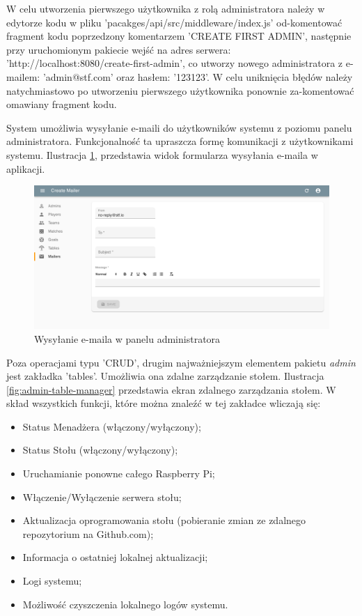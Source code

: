 W celu utworzenia pierwszego użytkownika z rolą administratora należy w edytorze kodu w pliku 'pacakges/api/src/middleware/index.js' od-komentować fragment kodu poprzedzony komentarzem 'CREATE FIRST ADMIN', następnie przy uruchomionym pakiecie wejść na adres serwera: 'http://localhost:8080/create-first-admin', co utworzy nowego administratora z e-mailem: 'admin@stf.com' oraz hasłem: '123123'. W celu uniknięcia błędów należy natychmiastowo po utworzeniu pierwszego użytkownika ponownie za-komentować omawiany fragment kodu.

\newpage

System umożliwia wysyłanie e-maili do użytkowników systemu z poziomu panelu administratora. Funkcjonalność ta upraszcza formę komunikacji z użytkownikami systemu. Ilustracja \ref{fig:admin-send-mail}, przedstawia widok formularza wysyłania e-maila w aplikacji.

\begin{figure}[h!]
  \centering
    \includegraphics[width=\textwidth]{images/admin/mailer.png}
  \caption{Wysyłanie e-maila w panelu administratora}
  \label{fig:admin-send-mail}
\end{figure}

Poza operacjami typu 'CRUD', drugim najważniejszym elementem pakietu \textit{admin} jest zakładka 'tables'. Umożliwia ona zdalne zarządzanie stołem. Ilustracja \ref{fig:admin-table-manager} przedstawia ekran zdalnego zarządzania stołem. W skład wszystkich funkcji, które można znaleźć w tej zakładce wliczają się:

\begin{itemize}
	\item Status Menadżera (włączony/wyłączony);
	\item Status Stołu (włączony/wyłączony);
	\item Uruchamianie ponowne całego Raspberry Pi;
	\item Włączenie/Wyłączenie serwera stołu;
	\item Aktualizacja oprogramowania stołu (pobieranie zmian ze zdalnego repozytorium na Github.com);
	\item Informacja o ostatniej lokalnej aktualizacji;
	\item Logi systemu;
	\item Możliwość czyszczenia lokalnego logów systemu.
\end{itemize}

